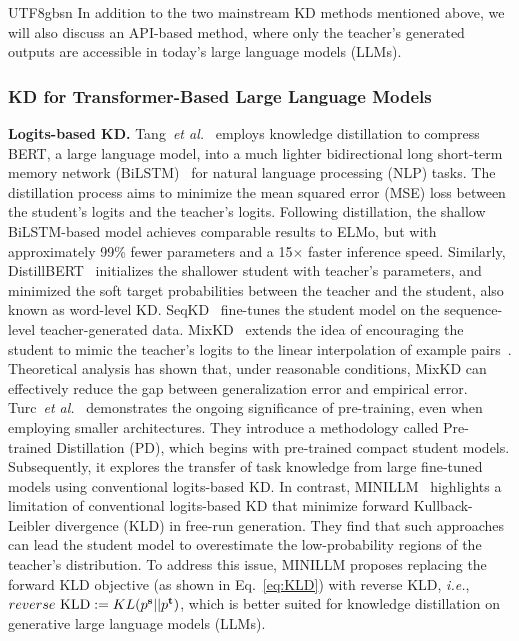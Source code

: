 \documentclass[10pt,journal,compsoc]{IEEEtran}
\newcommand{\etal}{\emph{et al.}}
\newcommand{\ie}{\emph{i.e.}}
\newcommand{\<}{\left\langle}
\renewcommand{\>}{\right\rangle}
\newcommand{\1}{\mathbbm{1}}
\begin{document}
\begin{CJK}{UTF8}{gbsn}
In addition to the two mainstream KD methods mentioned above, we will also discuss an API-based method, where only the teacher's generated outputs are accessible in today's large language models (LLMs).


\subsubsection{KD for Transformer-Based Large Language Models}
\noindent\textbf{Logits-based KD.}
Tang~\etal~\cite{tang2019distilling} employs knowledge distillation to compress BERT\cite{devlin2018bert}, a large language model, into a much lighter bidirectional long short-term memory network (BiLSTM)~\cite{hochreiter1997long} for natural language processing (NLP) tasks. The distillation process aims to minimize the mean squared error (MSE) loss between the student's logits and the teacher's logits. Following distillation, the shallow BiLSTM-based model achieves comparable results to ELMo\cite{peters1802deep}, but with approximately 99\% fewer parameters and a 15$\times$ faster inference speed. Similarly, DistillBERT~\cite{sanh2019distilbert} initializes the shallower student with teacher’s parameters, and minimized the soft target probabilities between the teacher and the student, also known as word-level KD.
SeqKD~\cite{kim2016sequence} fine-tunes the student model on the sequence-level teacher-generated data.
MixKD~\cite{liang2020mixkd} extends the idea of encouraging the student to mimic the teacher's logits to the linear interpolation of example pairs~\cite{zhang2017mixup}. Theoretical analysis has shown that, under reasonable conditions, MixKD can effectively reduce the gap between generalization error and empirical error.
Turc~\etal~\cite{turc2019well} demonstrates the ongoing significance of pre-training, even when employing smaller architectures. They introduce a methodology called Pre-trained Distillation (PD), which begins with pre-trained compact student models. Subsequently, it explores the transfer of task knowledge from large fine-tuned models using conventional logits-based KD.
In contrast, MINILLM~\cite{gu2023knowledge} highlights a limitation of conventional logits-based KD that minimize forward Kullback-Leibler divergence (KLD) in free-run generation. They find that such approaches can lead the student model to overestimate the low-probability regions of the teacher's distribution. To address this issue, MINILLM proposes replacing the forward KLD objective (as shown in Eq.~\ref{eq:KLD}) with reverse KLD, \ie, $reverse~\mathrm{KLD}:=KL(p^{\bf s}||p^{\bf t})$, which is better suited for knowledge distillation on generative large language models (LLMs).

\end{CJK}
\end{document}
